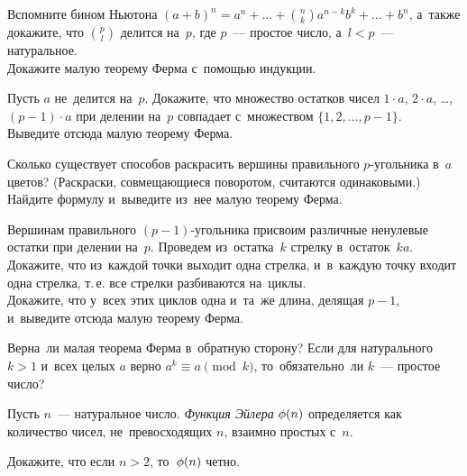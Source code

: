 \begin{problems}

\item
\subproblem
Вспомните бином Ньютона
\(
    (a + b)^{n}
=
    a^{n} + \ldots + \binom{n}{k} a^{n-k} b^{k} + \ldots + b^{n}
\),
а~также докажите, что $\binom{p}{l}$ делится на~$p$, где $p$~--- простое число,
а~$l < p$~--- натуральное.
\\
\subproblem
Докажите малую теорему Ферма с~помощью индукции.

\item%
%
\subproblem
Пусть $a$ не~делится на~$p$.
Докажите, что множество остатков чисел
$1 \cdot a$, $2\cdot a$, \ldots, $(p - 1) \cdot a$ при делении на~$p$ совпадает
с~множеством $\{ 1, 2, \ldots, p - 1 \}$.
\\
\subproblem
Выведите отсюда малую теорему Ферма.

\item
Сколько существует способов раскрасить вершины правильного $p$-угольника
в~$a$ цветов?
(Раскраски, совмещающиеся поворотом, считаются одинаковыми.)
Найдите формулу и~выведите из~нее малую теорему Ферма.

\item
{}%
Вершинам правильного $(p - 1)$-угольника присвоим различные ненулевые остатки
при делении на~$p$.
Проведем из~остатка~$k$ стрелку в~остаток~$k a$.
\\
\subproblem
Докажите, что из~каждой точки выходит одна стрелка, и~в~каждую точку входит
одна стрелка, т.\,е. все стрелки разбиваются на~циклы.
\\
\subproblem
Докажите, что у~всех этих циклов одна и~та~же длина, делящая $p - 1$,
и~выведите отсюда малую теорему Ферма.

\item
Верна~ли малая теорема Ферма в~обратную сторону?
Если для натурального $k > 1$ и~всех целых $a$ верно $a^{k} \equiv a \pmod k$,
то~обязательно~ли $k$~--- простое число?

\end{problems}

Пусть $n$~--- натуральное число.
\emph{Функция Эйлера} $\phi(n)$ определяется как количество чисел,
не~превосходящих $n$, взаимно простых с~$n$.

Докажите, что если $n > 2$, то~$\phi(n)$ четно.


